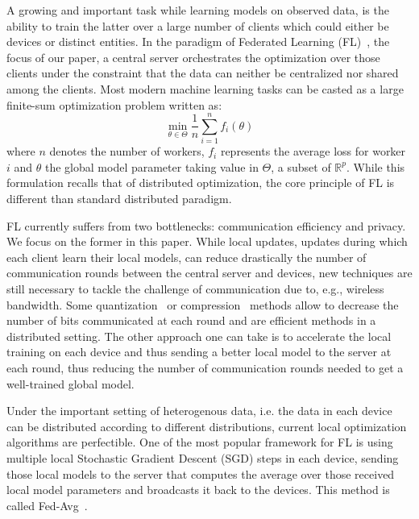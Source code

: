 \documentclass[11pt]{article}
\begin{document}
A growing and important task while learning models on observed data, is the ability to train the latter over a large number of clients which could either be devices or distinct entities.
In the paradigm of Federated Learning (FL)~\cite{konevcny2016federated,mcmahan2017communication}, the focus of our paper, a central server orchestrates the optimization over those clients under the constraint that the data can neither be centralized nor shared among the clients.
Most modern machine learning tasks can be casted as a large finite-sum optimization problem written as:
\begin{equation}\label{eq:opt}
\min \limits_{\theta \in \Theta} \frac{1}{n} \sum_{i=1}^n f_i(\theta)
\end{equation}
where $n$ denotes the number of workers, $f_i$ represents the average loss for worker $i$ and $\theta$ the global model parameter taking value in $\Theta$, a subset of $\mathbb{R}^p$.
While this formulation recalls that of distributed optimization, the core principle of FL is different than standard distributed paradigm.

FL currently suffers from two bottlenecks: communication efficiency and privacy.
We focus on the former in this paper.
While local updates, updates during which each client learn their local models, can reduce drastically the number of communication rounds between the central server and devices, new techniques are still necessary to tackle the  challenge of communication due to, e.g., wireless bandwidth.
Some quantization~\cite{alistarh2017qsgd, wangni2018gradient} or compression~\cite{lin2017deep} methods allow to decrease the number of bits communicated at each round and are efficient methods in a distributed setting.
The other approach one can take is to accelerate the local training on each device and thus sending a better local model to the server at each round, thus reducing the number of communication rounds needed to get a well-trained global model.

Under the important setting of heterogenous data, i.e. the data in each device can be distributed according to different distributions, current local optimization algorithms are perfectible.
One of the most popular framework for FL is using multiple local Stochastic Gradient Descent (SGD) steps in each device, sending those local models to the server that computes the average over those received local model parameters and broadcasts it back to the devices. This method is called Fed-Avg~\cite{mcmahan2017communication}.
\end{document}

